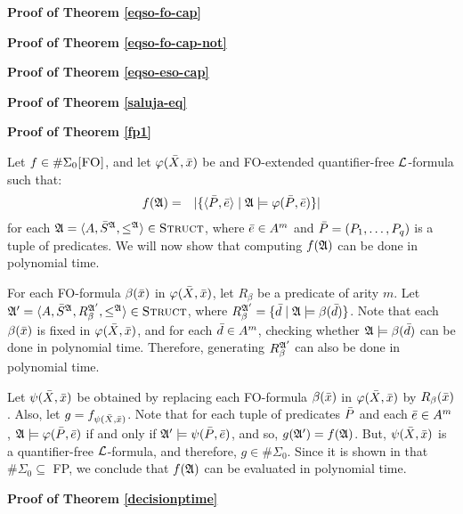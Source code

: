 \textbf{Proof of Theorem \ref{eqso-fo-cap}}


\textbf{Proof of Theorem \ref{eqso-fo-cap-not}}


\textbf{Proof of Theorem \ref{eqso-eso-cap}}



\textbf{Proof of Theorem \ref{saluja-eq}}


\textbf{Proof of Theorem \ref{fp1}}

Let $f \in \XE{0}$, and let $\varphi(\X,\x)$ be and {\sc FO}-extended quantifier-free $\L$-formula such that:
\begin{eqnarray*}
	f(\A) &=& \vert \{\langle \P,\e  \rangle \mid \A \models \varphi(\P,\e) \} \vert
\end{eqnarray*}
for each $\A = \langle A, \S^{\A}, \leq^{\A} \rangle \in \str$, where $\e \in A^m$ and $\P = (P_1,\ldots,P_q)$ is a tuple of predicates. We will now show that computing $f(\A)$ can be done in polynomial time.

For each {\sc FO}-formula $\beta(\x)$ in $\varphi(\X,\x)$, let $R_{\beta}$ be a predicate of arity $m$. Let $\A^\prime = \langle A, \S^{\A}, R_{\beta}^{\A^\prime}, \leq^{\A} \rangle \in \str$, where $R_{\beta}^{\A^\prime} = \{\d \mid \A \models \beta(\d)\}$. Note that each $\beta(\x)$ is fixed in $\varphi(\X,\x)$, and for each $\d \in A^m$, checking whether $\A \models \beta(\d)$ can be done in polynomial time. Therefore, generating $R_{\beta}^{\A^\prime}$ can also be done in polynomial time.

Let $\psi(\X,\x)$ be obtained by replacing each {\sc FO}-formula $\beta(\x)$ in $\varphi(\X,\x)$ by $R_{\beta}(\x)$. Also, let $g = f_{\psi(\X,\x)}$. Note that for each tuple of predicates $\P$ and each $\e \in A^m$, $\A \models \varphi(\P,\e)$ if and only if $\A^\prime \models \psi(\P,\e)$, and so, $g(\A^\prime) = f(\A)$. But, $\psi(\X,\x)$ is a quantifier-free $\L$-formula, and therefore, $g \in \#\Sigma_0$. Since it is shown in \cite{DBLP:journals/jcss/SalujaST95} that $\#\Sigma_0 \subseteq$ {\sc FP}, we conclude that $f(\A)$ can be evaluated in polynomial time.
	
\textbf{Proof of Theorem \ref{decisionptime}}

